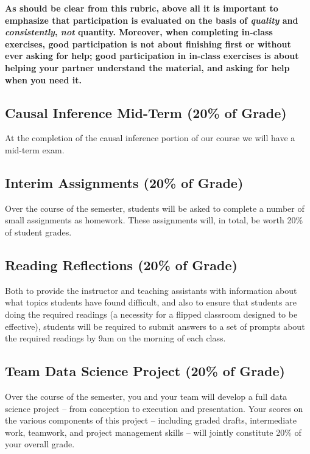 \documentclass[12pt]{article}
\begin{document}
\textbf{As should be clear from this rubric, above all it is important to emphasize that participation is evaluated on the basis of \emph{quality} and \emph{consistently}, \emph{not} quantity. Moreover, when completing in-class exercises, good participation is not about finishing first or without ever asking for help; good participation in in-class exercises is about helping your partner understand the material, and asking for help when you need it.}

\subsection{Causal Inference Mid-Term (20\% of Grade)}

At the completion of the causal inference portion of our course we will have a mid-term exam. 

\subsection{Interim Assignments (20\% of Grade)}

Over the course of the semester, students will be asked to complete a number of small assignments as homework. These assignments will, in total, be worth 20\% of student grades.

\subsection{Reading Reflections (20\% of Grade)}

Both to provide the instructor and teaching assistants with information about what topics students have found difficult, and also to ensure that students are doing the required readings (a necessity for a flipped classroom designed to be effective), students will be required to submit answers to a set of prompts about the required readings by 9am on the morning of each class.

\subsection{Team Data Science Project (20\% of Grade)}

Over the course of the semester, you and your team will develop a full data science project -- from conception to execution and presentation. Your scores on the various components of this project -- including graded drafts, intermediate work, teamwork, and project management skills -- will jointly constitute 20\% of your overall grade.
\end{document}
